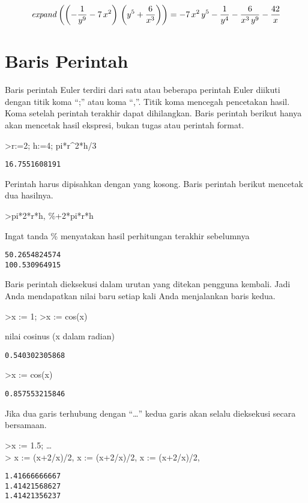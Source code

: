 \documentclass[
]{book}
\begin{document}
\[{\it expand}\left(\left(-\frac{1}{y^9}-7\,x^2\right)\,\left(y^5+  \frac{6}{x^3}\right)\right)=-7\,x^2\,y^5-\frac{1}{y^4}-\frac{6}{x^3  \,y^9}-\frac{42}{x}\]

\chapter{Baris Perintah}\label{baris-perintah}

Baris perintah Euler terdiri dari satu atau beberapa perintah Euler diikuti dengan titik koma ``;'' atau koma ``,''. Titik koma mencegah pencetakan hasil. Koma setelah perintah terakhir dapat dihilangkan. Baris perintah berikut hanya akan mencetak hasil ekspresi, bukan tugas atau perintah format.

\textgreater r:=2; h:=4; pi*r\^{}2*h/3

\begin{verbatim}
16.7551608191
\end{verbatim}

Perintah harus dipisahkan dengan yang kosong. Baris perintah berikut mencetak dua hasilnya.

\textgreater pi*2*r*h, \%+2*pi*r*h

Ingat tanda \% menyatakan hasil perhitungan terakhir sebelumnya

\begin{verbatim}
50.2654824574
100.530964915
\end{verbatim}

Baris perintah dieksekusi dalam urutan yang ditekan pengguna kembali. Jadi Anda mendapatkan nilai baru setiap kali Anda menjalankan baris kedua.

\textgreater x := 1; \textgreater x := cos(x)

nilai cosinus (x dalam radian)

\begin{verbatim}
0.540302305868
\end{verbatim}

\textgreater x := cos(x)

\begin{verbatim}
0.857553215846
\end{verbatim}

Jika dua garis terhubung dengan ``\ldots{}'' kedua garis akan selalu dieksekusi secara bersamaan.

\textgreater x := 1.5; \ldots{}\\
\textgreater{} x := (x+2/x)/2, x := (x+2/x)/2, x := (x+2/x)/2,

\begin{verbatim}
1.41666666667
1.41421568627
1.41421356237
\end{verbatim}
\end{document}
